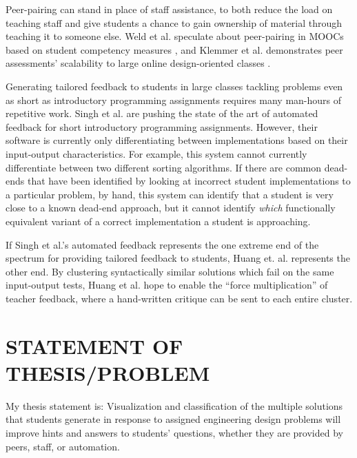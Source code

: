 \documentclass[12pt]{article}
\begin{document}
Peer-pairing can stand in place of staff assistance, to both reduce the load on teaching staff and give students a chance to gain ownership of material through teaching it to someone else. Weld et al. speculate about peer-pairing in MOOCs based on student competency measures \cite{WeldHcomp12}, and Klemmer et al. demonstrates peer assessments' scalability to large online design-oriented classes \cite{Klemmer}.

Generating tailored feedback to students in large classes tackling problems even as short as introductory programming assignments requires many man-hours of repetitive work. Singh et al. \cite{rishabh} are pushing the state of the art of automated feedback for short introductory programming assignments. However, their software is currently only differentiating between implementations based on their input-output characteristics. For example, this system cannot currently differentiate between two different sorting algorithms. If there are common dead-ends that have been identified by looking at incorrect student implementations to a particular problem, by hand, this system can identify that a student is very close to a known dead-end approach, but it cannot identify {\em which} functionally equivalent variant of a correct implementation a student is approaching. 

If Singh et al.'s automated feedback represents the one extreme end of the spectrum for providing tailored feedback to students, Huang et. al. \cite{MOOCshop} represents the other end. By clustering syntactically similar solutions which fail on the same input-output tests, Huang et al. hope to enable the ``force multiplication'' of teacher feedback, where a hand-written critique can be sent to each entire cluster.

%

\section{STATEMENT OF THESIS/PROBLEM}

My thesis statement is: Visualization and classification of the multiple solutions that students generate in response to assigned engineering design problems will improve hints and answers to students' questions, whether they are provided by peers, staff, or automation. 
\end{document}
